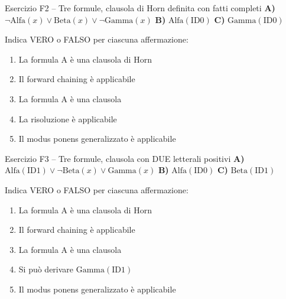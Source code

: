 \documentclass[12pt,a4paper]{article}
\begin{document}
\begin{vfbox}{Esercizio F2 -- Tre formule{,} clausola di Horn definita con fatti completi}
\textbf{A)} $\neg\text{Alfa}(x) \lor \text{Beta}(x) \lor \neg\text{Gamma}(x)$ \qquad
\textbf{B)} $\text{Alfa}(\text{ID0})$ \qquad
\textbf{C)} $\text{Gamma}(\text{ID0})$
\smallskip

Indica VERO o FALSO per ciascuna affermazione:
\begin{enumerate}[label=\arabic*.]
  \item La formula A è una clausola di Horn \hfill \underline{\hspace{2cm}}
  \item Il forward chaining è applicabile \hfill \underline{\hspace{2cm}}
  \item La formula A è una clausola \hfill \underline{\hspace{2cm}}
  \item La risoluzione è applicabile \hfill \underline{\hspace{2cm}}
  \item Il modus ponens generalizzato è applicabile \hfill \underline{\hspace{2cm}}
\end{enumerate}
\end{vfbox}

\begin{vfbox}{Esercizio F3 -- Tre formule{,} clausola con DUE letterali positivi}
\textbf{A)} $\text{Alfa}(\text{ID1}) \lor \neg\text{Beta}(x) \lor \text{Gamma}(x)$ \qquad
\textbf{B)} $\text{Alfa}(\text{ID0})$ \qquad
\textbf{C)} $\text{Beta}(\text{ID1})$
\smallskip

Indica VERO o FALSO per ciascuna affermazione:
\begin{enumerate}[label=\arabic*.]
  \item La formula A è una clausola di Horn \hfill \underline{\hspace{2cm}}
  \item Il forward chaining è applicabile \hfill \underline{\hspace{2cm}}
  \item La formula A è una clausola \hfill \underline{\hspace{2cm}}
  \item Si può derivare $\text{Gamma}(\text{ID1})$ \hfill \underline{\hspace{2cm}}
  \item Il modus ponens generalizzato è applicabile \hfill \underline{\hspace{2cm}}
\end{enumerate}
\end{vfbox}
\end{document}

